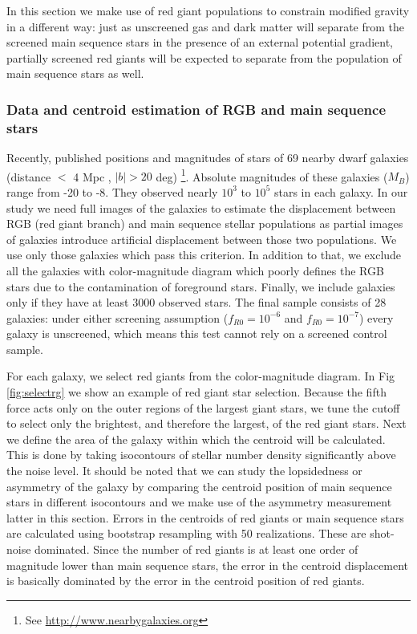 \documentclass[useAMS,usenatbib,twocolumn]{mn2e}
\begin{document}
In this section we make use of red giant populations
to constrain modified gravity in a different way:
just as unscreened gas and dark matter will separate from
the screened main sequence stars in the presence
of an external potential gradient, partially screened red giants
will be expected to separate from the population
of main sequence stars as well.

\subsubsection{Data and centroid estimation of RGB and main sequence stars}
Recently, \citet{dalcanton09} published positions and magnitudes
of stars of 69 nearby dwarf galaxies (distance $<$ 4 Mpc , $|b| > 20$ deg)
\footnote{See
\href{http://www.nearbygalaxies.org}{http://www.nearbygalaxies.org}}.
Absolute magnitudes of these galaxies ($M_B$) range from -20 to -8. They  
observed nearly $10^3$ to $10^5$ stars in each galaxy.
In our study we need full images of the galaxies to estimate the displacement
between RGB (red giant branch) and main sequence stellar populations as partial
images of galaxies introduce artificial displacement between those two
populations. We use only those galaxies which pass this criterion. In
addition to that, we exclude all the galaxies with color-magnitude diagram
which poorly defines the RGB stars due to the contamination of foreground stars.
Finally, we include galaxies only if they have at least 3000 observed stars.
The final sample consists of 28 galaxies: under either screening assumption
($f_{R0}=10^{-6}$ and $f_{R0}=10^{-7}$) every galaxy is unscreened,
which means this test cannot rely on a screened control sample.


For each galaxy, we select red giants from the 
color-magnitude diagram. In Fig \ref{fig:selectrg} we show an example of
red giant star selection.
Because the fifth force acts only on the outer regions of the largest giant
stars, we tune the cutoff to select only the brightest, and therefore the
largest, of the red giant stars.
Next we define the area of the galaxy within which
the centroid will be calculated.
This is done by taking isocontours of stellar number density significantly
above the noise level. It should be noted that we can study the lopsidedness or
asymmetry of the galaxy by comparing the centroid position of main sequence
stars in different isocontours and we make use of the asymmetry measurement
latter in this section. Errors in the centroids of red giants or main
sequence stars are calculated using bootstrap resampling with 50 realizations.
These are shot-noise dominated.
Since the number of red giants is at least one order of
magnitude lower than main sequence stars, the error  in the centroid
displacement is basically dominated by the error in the centroid position of
red giants.
\end{document}
